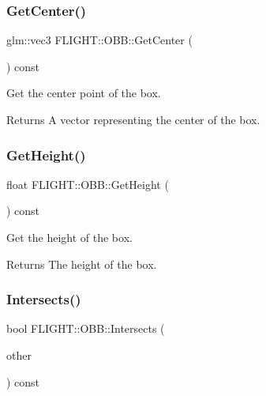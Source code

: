 \subsubsection{\texorpdfstring{Get\+Center()}{GetCenter()}}
{\footnotesize\ttfamily glm\+::vec3 F\+L\+I\+G\+H\+T\+::\+O\+B\+B\+::\+Get\+Center (\begin{DoxyParamCaption}{ }\end{DoxyParamCaption}) const}



Get the center point of the box. 

\begin{DoxyReturn}{Returns}
A vector representing the center of the box. 
\end{DoxyReturn}
\mbox{\label{class_f_l_i_g_h_t_1_1_o_b_b_a9216292dc4795cea396b228e12d6dc85}} 
\subsubsection{\texorpdfstring{Get\+Height()}{GetHeight()}}
{\footnotesize\ttfamily float F\+L\+I\+G\+H\+T\+::\+O\+B\+B\+::\+Get\+Height (\begin{DoxyParamCaption}{ }\end{DoxyParamCaption}) const}



Get the height of the box. 

\begin{DoxyReturn}{Returns}
The height of the box. 
\end{DoxyReturn}
\mbox{\label{class_f_l_i_g_h_t_1_1_o_b_b_a02827ad2d8631acaca03b8d658152c2a}} 
\subsubsection{\texorpdfstring{Intersects()}{Intersects()}}
{\footnotesize\ttfamily bool F\+L\+I\+G\+H\+T\+::\+O\+B\+B\+::\+Intersects (\begin{DoxyParamCaption}\item[{const \hyperlink{class_f_l_i_g_h_t_1_1_o_b_b}{O\+BB} \&}]{other }\end{DoxyParamCaption}) const}



